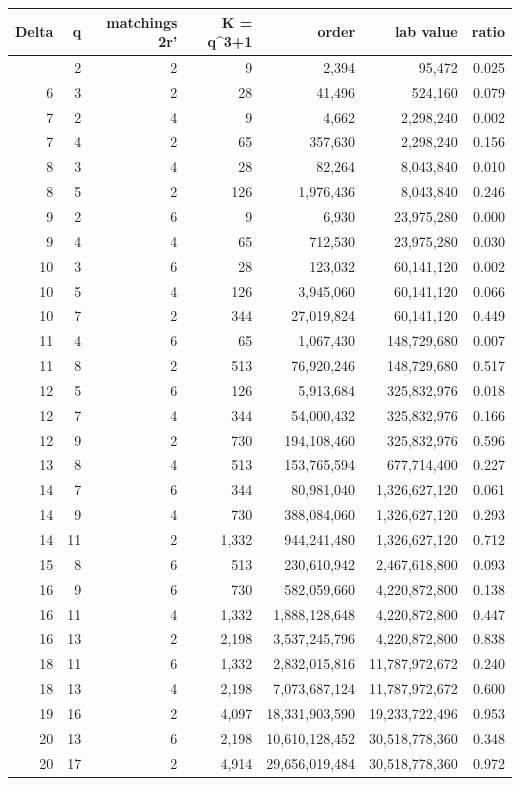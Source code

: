 \documentclass[
  10pt,
]{article}
\begin{document}
\begin{longtable}[]{@{}rrrrrrr@{}}
\toprule\noalign{}
Delta & q & matchings 2r' & K = q\^{}3+1 & order & lab value & ratio \\
\midrule\noalign{}
\endhead
\bottomrule\noalign{}
\endlastfoot
5 & 2 & 2 & 9 & 2,394 & 95,472 & 0.025 \\
6 & 3 & 2 & 28 & 41,496 & 524,160 & 0.079 \\
7 & 2 & 4 & 9 & 4,662 & 2,298,240 & 0.002 \\
7 & 4 & 2 & 65 & 357,630 & 2,298,240 & 0.156 \\
8 & 3 & 4 & 28 & 82,264 & 8,043,840 & 0.010 \\
8 & 5 & 2 & 126 & 1,976,436 & 8,043,840 & 0.246 \\
9 & 2 & 6 & 9 & 6,930 & 23,975,280 & 0.000 \\
9 & 4 & 4 & 65 & 712,530 & 23,975,280 & 0.030 \\
10 & 3 & 6 & 28 & 123,032 & 60,141,120 & 0.002 \\
10 & 5 & 4 & 126 & 3,945,060 & 60,141,120 & 0.066 \\
10 & 7 & 2 & 344 & 27,019,824 & 60,141,120 & 0.449 \\
11 & 4 & 6 & 65 & 1,067,430 & 148,729,680 & 0.007 \\
11 & 8 & 2 & 513 & 76,920,246 & 148,729,680 & 0.517 \\
12 & 5 & 6 & 126 & 5,913,684 & 325,832,976 & 0.018 \\
12 & 7 & 4 & 344 & 54,000,432 & 325,832,976 & 0.166 \\
12 & 9 & 2 & 730 & 194,108,460 & 325,832,976 & 0.596 \\
13 & 8 & 4 & 513 & 153,765,594 & 677,714,400 & 0.227 \\
14 & 7 & 6 & 344 & 80,981,040 & 1,326,627,120 & 0.061 \\
14 & 9 & 4 & 730 & 388,084,060 & 1,326,627,120 & 0.293 \\
14 & 11 & 2 & 1,332 & 944,241,480 & 1,326,627,120 & 0.712 \\
15 & 8 & 6 & 513 & 230,610,942 & 2,467,618,800 & 0.093 \\
16 & 9 & 6 & 730 & 582,059,660 & 4,220,872,800 & 0.138 \\
16 & 11 & 4 & 1,332 & 1,888,128,648 & 4,220,872,800 & 0.447 \\
16 & 13 & 2 & 2,198 & 3,537,245,796 & 4,220,872,800 & 0.838 \\
18 & 11 & 6 & 1,332 & 2,832,015,816 & 11,787,972,672 & 0.240 \\
18 & 13 & 4 & 2,198 & 7,073,687,124 & 11,787,972,672 & 0.600 \\
19 & 16 & 2 & 4,097 & 18,331,903,590 & 19,233,722,496 & 0.953 \\
20 & 13 & 6 & 2,198 & 10,610,128,452 & 30,518,778,360 & 0.348 \\
20 & 17 & 2 & 4,914 & 29,656,019,484 & 30,518,778,360 & 0.972 \\
\end{longtable}
\end{document}
